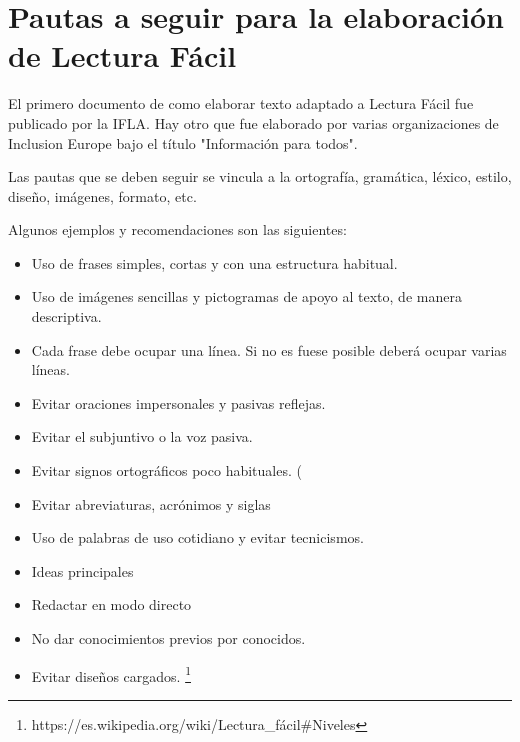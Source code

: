 \section{Pautas a seguir para la elaboración de Lectura Fácil}
 El primero documento de como elaborar texto adaptado a Lectura Fácil fue publicado por la IFLA. Hay otro que fue elaborado por varias organizaciones de Inclusion Europe bajo el título "Información para todos". 
 
 Las pautas que se deben seguir se vincula a la ortografía, gramática, léxico, estilo, diseño, imágenes, formato, etc. 
 
 Algunos ejemplos y recomendaciones son las siguientes:
 \begin{itemize}
 \item Uso de frases simples, cortas y con una estructura habitual.
 \item Uso de imágenes sencillas y pictogramas de apoyo al texto, de manera descriptiva.
 \item Cada frase debe ocupar una línea. Si no es fuese posible deberá ocupar varias líneas.
 \item Evitar oraciones impersonales y pasivas reflejas.
 \item Evitar el subjuntivo o la voz pasiva.
 \item Evitar signos ortográficos poco habituales. (%
 \item Evitar abreviaturas, acrónimos y siglas
 \item Uso de palabras de uso cotidiano y evitar tecnicismos.
 \item Ideas principales
 \item Redactar en modo directo
 \item No dar conocimientos previos por conocidos.
 \item Evitar diseños cargados.
 \footnote{https://es.wikipedia.org/wiki/Lectura\_fácil\#Niveles} 
\end{itemize}
